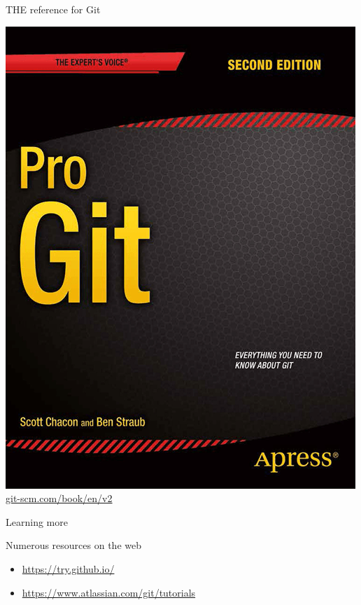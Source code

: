 \documentclass[xcolor=table,compress]{beamer}
\begin{document}
\begin{frame}{THE reference for Git}
\begin{center}
\includegraphics[height=0.7\textheight]{./progit2}\newline\Large
\href{https://git-scm.com/book/en/v2}{git-scm.com/book/en/v2}
\end{center}
\end{frame}


\begin{frame}{Learning more}
\begin{block}{Numerous resources on the web}
\begin{itemize}
	\item \url{https://try.github.io/}
	\item \url{https://www.atlassian.com/git/tutorials}
\end{itemize}
\end{block}
\end{frame}
\end{document}
